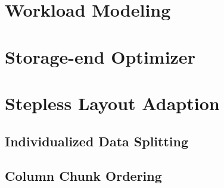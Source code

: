 \section{Workload Modeling}
\label{sec:workload-modeling}

\section{Storage-end Optimizer}
\label{sec:storage-end-optimizer}

\section{Stepless Layout Adaption}
\label{sec:stepless-layout-adaption}

\subsection{Individualized Data Splitting}
\label{subsec:data-splitting}

\subsection{Column Chunk Ordering}
\label{subsec:column-chunk-ordering}